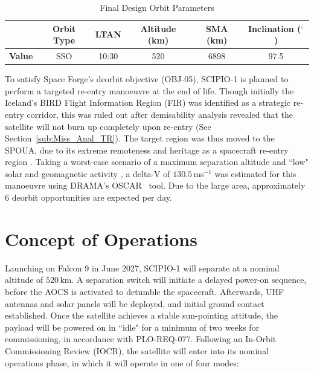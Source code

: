 \documentclass[a4paper, 11pt, conference]{IEEEtran}
\begin{document}
\begin{table}[H]
    \centering
    \caption{Final Design Orbit Parameters}
    \begin{tabularx}{0.6\linewidth}{l c c c c c}
        \toprule
         & \textbf{Orbit Type} 
         & \textbf{LTAN} 
         & \textbf{Altitude (km)} 
         & \textbf{SMA (km)} 
         & \textbf{Inclination ($^\circ$)} \\
        \midrule
        \textbf{Value} 
         & SSO 
         & 10:30 
         & 520 
         & 6898
         & 97.5 \\
        \bottomrule
    \end{tabularx}
    \label{tab:Orbit_Params}
\end{table}


\vspace{-10pt}
To satisfy Space Forge's deorbit objective (OBJ-05),  SCIPIO-1 is planned to perform a targeted re-entry manoeuvre at the end of life. Though initially the Iceland's BIRD Flight Information Region (FIR)\label{nom:bird} was identified as a strategic re-entry corridor, this was ruled out after demisability analysis revealed that the satellite will not burn up completely upon re-entry (See Section~\ref{sub:Miss_Anal_TR}). The target region was thus moved to the SPOUA, due to its extreme remoteness and heritage as a spacecraft re-entry region \cite{ESA_reentry_2017}. Taking a worst-case scenario of a maximum separation altitude and ``low" solar and geomagnetic activity \cite{noauthor_ecss-e-st-10-04c_nodate}, a delta-V of $130.5$\,ms$^{-1}$ was estimated for this manoeuvre using DRAMA's OSCAR~\cite{noauthor_drama_nodate} tool. Due to the large area, approximately 6 deorbit opportunities are expected per day.



\section{Concept of Operations}
Launching on Falcon 9 in June 2027, SCIPIO-1 will separate at a nominal altitude of $520\,\mathrm{km}$. A separation switch will initiate a delayed power-on sequence, before the AOCS\label{nom:aocs} is activated to detumble the spacecraft. Afterwards, UHF antennas and solar panels will be deployed, and initial ground contact established. Once the satellite achieves a stable sun-pointing attitude, the payload will be powered on in ``idle" for a minimum of two weeks for commissioning, in accordance with PLO-REQ-077. Following an In-Orbit Commissioning Review (IOCR)\label{nom:iocr}, the satellite will enter into its nominal operations phase, in which it will operate in one of four modes:
\end{document}
